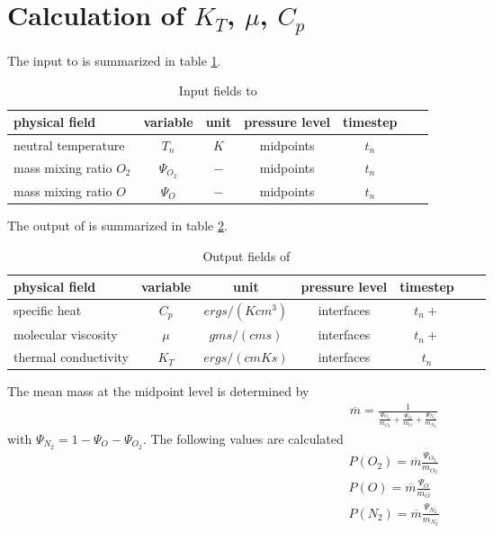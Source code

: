 %
\section{Calculation of $K_T$, $\mu$, $C_p$ 
}\label{cap:cpktkm}
%
The input to  is summarized in table
\ref{tab:input_cpktkm}.
%
\begin{table}[tb]
\begin{tabular}{|p{3.5cm} ||c|c|c|c|c|c|} \hline
physical field               & variable        & unit&pressure
level& timestep
\\ \hline \hline
%
neutral temperature &       $T_n$              & $K$   &  midpoints & $t_n$\\
mass mixing ratio $O_2$&       {$\Psi_{O_2}$}     & $-$   & midpoints  & $t_n$\\
mass mixing ratio $O$&       {$\Psi_{O}$}     & $-$   &  midpoints &
$t_n$
 \\ \hline
\end{tabular}
\caption{Input fields to }
\label{tab:input_cpktkm}
\end{table}
%
The output of  is summarized in table
\ref{tab:output_cpktkm}.
%
\begin{table}[tb]
\begin{tabular}{|p{3.5cm} ||c|c|c|c|c|c|} \hline
physical field               & variable        & unit&pressure
level& timestep \\ \hline \hline
specific heat    & $C_p$   & $ergs/(K cm^3)$   & interfaces  & $t_n+$ \\
molecular viscosity    & $\mu$   & $gms/(cm s)$   & interfaces  & $t_n+$ \\
thermal conductivity    & $K_T$   & $ergs/(cm K s)$   & interfaces & $t_n$
\\ \hline \hline
\end{tabular}
\caption{Output fields of }
\label{tab:output_cpktkm}
\end{table}
%
%
The mean mass at the midpoint level is determined by
%
\begin{align}
  \overline{m} = \frac{1}{\frac{\Psi_{O_2}}{m_{O_2}} +
       \frac{\Psi_{O}}{m_{O}} + \frac{\Psi_{N_2}}{m_{N_2}}}
\end{align}
%
with $\Psi_{N_2} = 1 - \Psi_{O} - \Psi_{O_2}$. The following values
are calculated
%
\begin{align}
  P(O_2) = \overline{m} \frac{\Psi_{O_2}}{m_{O_2}} \\
  P(O) = \overline{m} \frac{\Psi_{O}}{m_{O}} \\
  P(N_2) = \overline{m} \frac{\Psi_{N_2}}{m_{N_2}}
\end{align}
